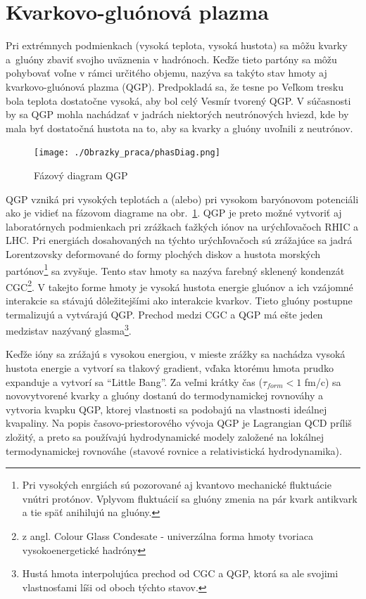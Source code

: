 \documentclass[thesismargins, thesislinespacing]{rnthesis}
\begin{document}
\section{Kvarkovo-gluónová plazma}

Pri extrémnych podmienkach (vysoká teplota, vysoká hustota) sa môžu kvarky a~gluó\-ny zbaviť svojho uväznenia v hadrónoch. Keďže tieto partóny sa môžu pohybovať voľne v rámci určitého objemu, nazýva sa takýto stav hmoty aj kvarkovo-gluónová plazma (QGP). Predpokladá sa, že tesne po Veľkom tresku bola teplota dostatočne vysoká, aby bol celý Vesmír tvorený QGP. V súčasnosti by sa QGP mohla nachádzať v jadrách niektorých neutrónových hviezd, kde by mala byť dostatočná hustota na to, aby sa kvarky a gluóny uvoľnili z neutrónov.

\begin{figure}[hbtp!]
	\begin{center}
		\texttt{[image: ./Obrazky\_praca/phasDiag.png]}
		\caption{ Fázový diagram QGP \cite{phasDiagram}}
		\label{fazDiag}
	\end{center}
\end{figure}  

QGP vzniká pri vysokých teplotách a (alebo) pri vysokom baryónovom potenciáli ako je vidieť na fázovom diagrame na obr.~\ref{fazDiag}. QGP je preto možné vytvoriť aj laboratórnych podmienkach pri zrážkach ťažkých iónov na urýchľovačoch RHIC a LHC. Pri energiách dosahovaných na týchto urýchľovačoch sú zrážajúce sa jadrá Lorentzovsky deformované do formy plochých diskov a hustota morských partónov\footnote{Pri vysokých enrgiách sú pozorované aj kvantovo mechanické fluktuácie vnútri protónov. Vplyvom fluktuácií sa gluóny zmenia na pár kvark antikvark a tie späť anihilujú na gluóny.} sa zvyšuje. Tento stav hmoty sa nazýva farebný sklenený kondenzát CGC\footnote{z angl. Colour Glass Condesate - univerzálna forma hmoty tvoriaca vysokoenergetické hadróny\cite{hevion}}. V takejto forme hmoty je vysoká hustota energie gluónov a ich vzájomné interakcie sa stávajú dôležitejšími ako interakcie kvarkov. Tieto gluóny postupne termalizujú a vytvárajú QGP. Prechod medzi CGC a QGP má ešte jeden medzistav nazývaný glasma\footnote{Hustá hmota interpolujúca prechod od CGC a QGP, ktorá sa ale svojimi vlastnosťami líši od oboch týchto stavov\cite{hevion}.}\cite{glasma}.

Keďže ióny sa zrážajú s vysokou energiou, v mieste zrážky sa nachádza vysoká hustota energie a vytvorí sa tlakový gradient, vďaka ktorému hmota prudko expanduje a vytvorí sa “Little Bang”. Za veľmi krátky čas ($\tau_{form}<1$ fm/c)  sa novovytvorené kvarky a gluóny dostanú do termodynamickej rovnováhy a vytvoria kvapku QGP, ktorej vlastnosti sa podobajú na vlastnosti ideálnej kvapaliny. Na popis časovo-priestorového vývoja QGP je Lagrangian QCD príliš zložitý, a preto sa používajú hydrodynamické modely založené na lokálnej termodynamickej rovnováhe (stavové rovnice a relativistická hydrodynamika).
\end{document}
